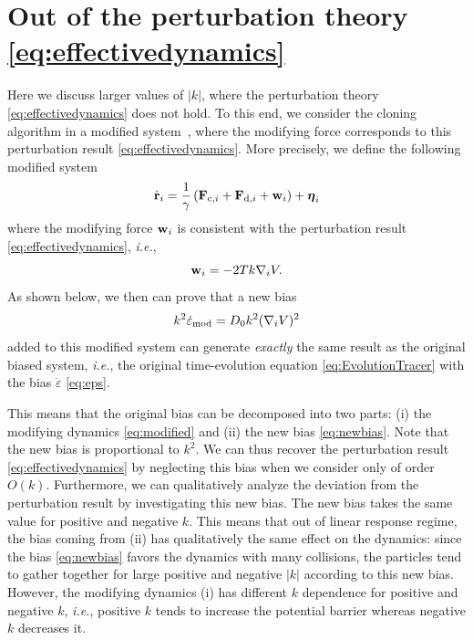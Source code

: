 \documentclass[pre, superscriptaddress, twocolumn,pre]{revtex4-1}
\begin{document}
\section{Out of the perturbation theory \eqref{eq:effectivedynamics}}
\label{sec:far}
Here we discuss larger values of $|k|$, where the perturbation theory \eqref{eq:effectivedynamics} does not hold. 
To this end, we consider the cloning algorithm in a modified system~\cite{Nemoto2016,Ray2018,Klymko2018}, where the modifying force corresponds to this perturbation result \eqref{eq:effectivedynamics}. More precisely, we define the following modified system
\begin{equation}
\label{eq:modified}
	\dot{\bf r}_i = \frac{1}{\gamma} \left({\bf F}_{{\rm c},i} + {\bf F}_{{\rm d},i} + {\bf w}_i  \right) + {\boldsymbol\eta}_i
\end{equation}
where the modifying force ${\bf w}_i$ is consistent with the perturbation result \eqref{eq:effectivedynamics}, {\it i.e.}, 
\begin{equation}
\label{eq:pertubation_result}
{\bf w}_i = - 2 T k \nabla_i V. 
\end{equation}
As shown below, we then can prove that a new bias
\begin{equation}
\label{eq:newbias}
k^2 \dot \varepsilon_{\rm mod} = D_0 k^2 (\nabla_i V)^2 
\end{equation}
added to this modified system can generate {\it exactly} the same result as the original biased system, {\it i.e.},  the original time-evolution equation \eqref{eq:EvolutionTracer} with the bias $\dot \varepsilon$ \eqref{eq:eps}. 



This means that the original bias can be decomposed into two parts: (i) the modifying dynamics \eqref{eq:modified} and (ii) the new bias \eqref{eq:newbias}. Note that the new bias is proportional to $k^2$. We can thus recover the perturbation result \eqref{eq:effectivedynamics} by neglecting this bias when we consider only of order $O(k)$. Furthermore, we can qualitatively analyze the deviation from the perturbation result by investigating this new bias. 
The new bias takes the same value for positive and negative $k$. This means that out of linear response regime, the bias coming from (ii) has qualitatively the same effect on the dynamics: since the bias 
\eqref{eq:newbias} favors the dynamics with many collisions, the particles tend to gather together for large positive and negative $|k|$ according to this new bias. However, the modifying dynamics (i) has different $k$ dependence for positive and negative $k$, {\it i.e.}, positive $k$ tends to increase the potential barrier whereas negative $k$ decreases it. 
\end{document}

